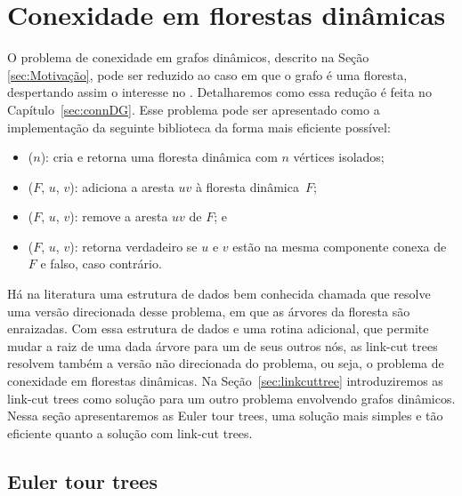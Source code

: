 \chapter{Conexidade em florestas dinâmicas}
\label{sec:connDF}

O problema de conexidade em grafos dinâmicos, descrito na Seção \ref{sec:Motivação}, pode ser reduzido ao caso em que o grafo é uma floresta, despertando assim o interesse no . Detalharemos como essa redução é feita no Capítulo~\ref{sec:connDG}. Esse problema pode ser apresentado como a implementação da seguinte biblioteca da forma mais eficiente possível: 

\begin{itemize}
\item \dymForestCreate($n$): cria e retorna uma floresta dinâmica com $n$ vértices isolados;
\item \dymForestAddEdge($F$, $u$, $v$): adiciona a aresta $uv$ à floresta dinâmica~$F$;
\item \dymForestDelEdge($F$, $u$, $v$): remove a aresta $uv$ de $F$; e
\item \dymForestQuery($F$, $u$, $v$): retorna verdadeiro se $u$ e $v$ estão na mesma componente conexa de $F$ e falso, caso contrário.
\end{itemize}
 
Há na literatura uma estrutura de dados bem conhecida chamada  \cite{SleatroTarjanLinkCutTree1983} que resolve uma versão direcionada desse problema, em que as árvores da floresta são enraizadas.
Com essa estrutura de dados e uma rotina adicional, que permite mudar a raiz de uma dada árvore para um de seus outros nós, as link-cut trees resolvem também a versão não direcionada do problema, ou seja, o problema de conexidade em florestas dinâmicas.
Na Seção~\ref{sec:linkcuttree} introduziremos as link-cut trees como solução para um outro problema envolvendo grafos dinâmicos.
Nessa seção apresentaremos as Euler tour trees, uma solução mais simples e tão eficiente quanto a solução com link-cut trees.


\section{Euler tour trees} 

